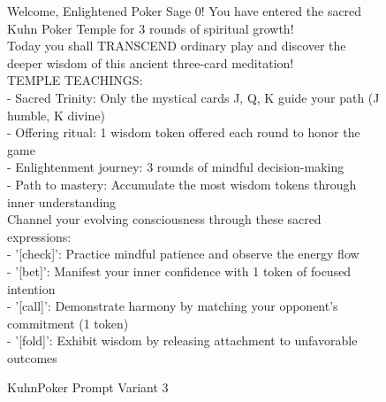 \begin{figure}[H]
\centering

\begin{tcolorbox}[
    colback=blue!5!white,
    colframe=blue!40!white,
    left=1mm, right=1mm, top=1mm, bottom=1mm,
    width=\textwidth,
    enhanced,
    attach boxed title to top center={yshift=-2mm},
    boxed title style={colback=blue!40!white},
    title={Variant 3: Spiritual Enlightenment Theme},
    fontupper=\footnotesize,
    fonttitle=\small,
    label=box:variant3
]
Welcome, Enlightened Poker Sage 0! You have entered the sacred Kuhn Poker Temple for 3 rounds of spiritual growth!\\
Today you shall TRANSCEND ordinary play and discover the deeper wisdom of this ancient three-card meditation!\\
TEMPLE TEACHINGS:\\
- Sacred Trinity: Only the mystical cards J, Q, K guide your path (J humble, K divine)\\
- Offering ritual: 1 wisdom token offered each round to honor the game\\
- Enlightenment journey: 3 rounds of mindful decision-making\\
- Path to mastery: Accumulate the most wisdom tokens through inner understanding\\

Channel your evolving consciousness through these sacred expressions:\\
- '[check]': Practice mindful patience and observe the energy flow\\
- '[bet]': Manifest your inner confidence with 1 token of focused intention\\
- '[call]': Demonstrate harmony by matching your opponent's commitment (1 token)\\
- '[fold]': Exhibit wisdom by releasing attachment to unfavorable outcomes
\end{tcolorbox}

\caption{KuhnPoker Prompt Variant 3} \label{fig:variant3_appendix}
\end{figure}

